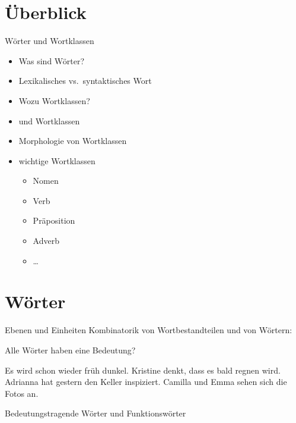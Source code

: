 \section{Überblick}

\begin{frame}
  {Wörter und Wortklassen}
  \pause
  \begin{itemize}[<+->]
    \item Was sind Wörter?
    \item Lexikalisches vs.\ syntaktisches Wort
      \Halbzeile
    \item Wozu Wortklassen?
    \item {} und Wortklassen
    \item \alert{Morphologie} von Wortklassen
      \Halbzeile
    \item wichtige Wortklassen
      \begin{itemize}[<+->]
        \item Nomen
        \item Verb
        \item Präposition
        \item Adverb
        \item \ldots
      \end{itemize}
  \end{itemize}
\end{frame}


\section{Wörter}

\begin{frame}
  {Ebenen und Einheiten}
  \pause
  Kombinatorik von Wortbestandteilen und von Wörtern:
  \pause
  \Zeile
  \begin{exe}
    \ex
    \begin{xlist}
      \pause
    \end{xlist}
    \pause
    \Zeile
    \ex
    \begin{xlist}
      \pause
    \end{xlist}
  \end{exe}
\end{frame}

\begin{frame}
  {Alle Wörter haben eine Bedeutung?}
  \pause
  \begin{exe}
    \ex \alert{Es} \alert{wird} schon wieder früh dunkel.
    \pause
    \ex Kristine denkt, \alert{dass} \alert{es} bald regnen \alert{wird}.
    \pause
    \ex Adrianna \alert{hat} gestern \alert{den} Keller inspiziert.
    \pause
    \ex Camilla \alert{und} Emma sehen \alert{sich} \alert{die} Fotos \alert{an}.
  \end{exe}
  \Zeile
  \pause
  \large
  \alert{Bedeutungstragende} Wörter und \alert{Funktionswörter}
\end{frame}

